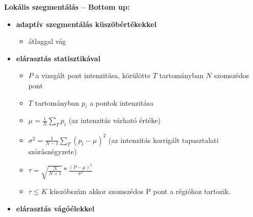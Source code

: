 \textbf{Lokális szegmentálás – Bottom up:}
\begin{itemize}
    \item \textbf{adaptív szegmentálás küszöbértékekkel}
    \begin{itemize}
        \item átlaggal vág
    \end{itemize}
    \item \textbf{elárasztás statisztikával}
    \begin{itemize}
        \item $P$ a vizsgált pont intenzitása, körülötte $T$ tartományban $N$ szomszédos pont
        \item $T$ tartományban $p_i$ a pontok intenzitása
        \item $\mu = \frac{1}{N} \sum_T p_i$ (az intenzitás várható értéke)
        \item $\sigma^2 = \frac{1}{N-1} \sum_T (p_i - \mu)^2$ (az intenzitás korrigált tapasztalati szórásnégyzete)
        \item $\tau = \sqrt{\frac{N}{N+1}} * \frac{(P - \mu)^2}{\sigma^2}$
        \item $\tau \le K$ küszöbszám akkor szomszédos P pont a régióhoz tartozik.
    \end{itemize}
    \item \textbf{elárasztás vágóélekkel}
\end{itemize}

